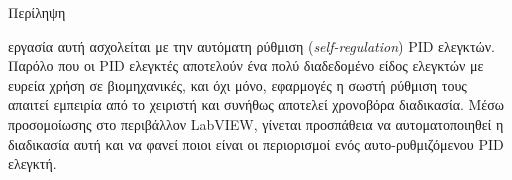 \pagestyle{plain}
\begin{center}
{\LARGE Περίληψη}\\[1cm]
\end{center}


\lettrine[findent=2pt]{}{ } εργασία αυτή ασχολείται με την αυτόματη ρύθμιση (\emph{self-regulation}) PID ελεγκτών. Παρόλο που οι PID ελεγκτές αποτελούν ένα πολύ διαδεδομένο είδος ελεγκτών με ευρεία χρήση σε βιομηχανικές, και όχι μόνο, εφαρμογές η σωστή ρύθμιση τους απαιτεί εμπειρία από το χειριστή και συνήθως αποτελεί χρονοβόρα διαδικασία. Μέσω προσομοίωσης στο περιβάλλον LabVIEW, γίνεται προσπάθεια να αυτοματοποιηθεί η διαδικασία αυτή και να φανεί ποιοι είναι οι περιορισμοί ενός αυτο-ρυθμιζόμενου PID ελεγκτή.